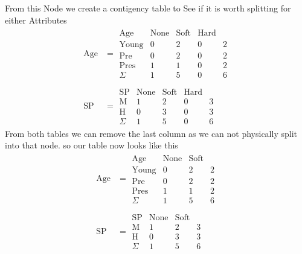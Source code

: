 \documentclass[12pt,english]{article}
\begin{document}
From this Node we create a contigency table to See if it is worth splitting for either Attributes
\begin{equation}\tag{2}\label{eq:6}
\begin{split}
\mbox{Age} &= 
\begin{array}{c|ccc|c}
\mbox{Age}   & \mbox{None} & \mbox{Soft} & \mbox{Hard} & \\
\hline
\mbox{Young} & 0 & 2 & 0 & 2 \\
\mbox{Pre}     & 0 & 2 & 0 & 2\\
\mbox{Pres}   & 1 & 1 & 0 & 2\\
\hline
\Sigma           & 1 & 5 & 0 & 6
\end{array}
\\
\\
\mbox{SP} &= 
\begin{array}{c|ccc|c}
\mbox{SP}   & \mbox{None} & \mbox{Soft} & \mbox{Hard} & \\
\hline
\mbox{M} & 1 & 2 & 0 & 3 \\
\mbox{H} & 0 & 3 & 0 & 3\\
\hline
\Sigma     & 1 & 5 & 0 & 6
\end{array}
\end{split}
\end{equation}
From both tables we can remove the last column as we can not physically split into that node.
so our table now looks like this
\begin{equation}\tag{2}\label{eq:6}
\begin{split}
\mbox{Age} &= 
\begin{array}{c|cc|c}
\mbox{Age}   & \mbox{None} & \mbox{Soft} & \\
\hline
\mbox{Young} & 0 & 2 & 2 \\
\mbox{Pre}     & 0 & 2 & 2\\
\mbox{Pres}   & 1 & 1 & 2\\
\hline
\Sigma           & 1 & 5 & 6
\end{array}
\\
\\
\mbox{SP} &= 
\begin{array}{c|cc|c}
\mbox{SP}   & \mbox{None} & \mbox{Soft}& \\
\hline
\mbox{M} & 1 & 2 & 3 \\
\mbox{H} & 0 & 3 & 3\\
\hline
\Sigma     & 1 & 5 & 6
\end{array}
\end{split}
\end{equation}
\end{document}
